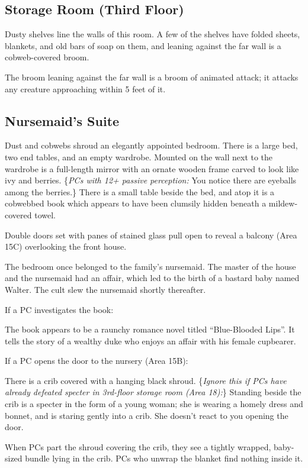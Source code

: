 \pagebreak
\subsection{Storage Room (Third Floor)}
\label{sec:StorageRoom3dFlr}
\begin{readout}
  Dusty shelves line the walls of this room. A few of the shelves have folded sheets, blankets, and old bars
  of soap on them, and leaning against the far wall is a cobweb-covered broom.
\end{readout}
The broom leaning against the far wall is a broom of animated attack; it attacks any creature approaching
within 5 feet of it.

\begin{arealinks}
\end{arealinks}


\pagebreak
\subsection{Nursemaid's Suite}
\label{sec:NursemaidsSuite}
\begin{readout}
  Dust and cobwebs shroud an elegantly appointed bedroom. There is a large bed, two end tables, and an
  empty wardrobe. Mounted on the wall next to the wardrobe is a full-length mirror with an ornate wooden
  frame carved to look like ivy and berries. \{\textit{PCs with 12+ passive perception:} You notice there
  are eyeballs among the berries.\} There is a small table beside the bed, and atop it is a cobwebbed book
  which appears to have been clumsily hidden beneath a mildew-covered towel.
\end{readout}
Double doors set with panes of stained glass pull open to reveal a balcony (Area 15C) overlooking the front
house.

The bedroom once belonged to the family's nursemaid. The master of the house and the nursemaid had an affair,
which led to the birth of a bastard baby named Walter. The cult slew the nursemaid shortly thereafter.

If a PC investigates the book:
\begin{readout}
  The book appears to be a raunchy romance novel titled ``Blue-Blooded Lips''. It tells the story of a wealthy
  duke who enjoys an affair with his female cupbearer.
\end{readout}
If a PC opens the door to the nursery (Area 15B):
\begin{readout}
  There is a crib covered with a hanging black shroud. \{\textit{Ignore this if PCs have already defeated
  specter in 3rd-floor storage room (Area 18):}\} Standing beside the crib is a specter in the form
  of a young woman; she is wearing a homely dress and bonnet, and is staring gently into a crib.
  She doesn't react to you opening the door.
\end{readout}
When PCs part the shroud covering the crib, they see a tightly wrapped, baby-sized bundle lying in the crib.
PCs who unwrap the blanket find nothing inside it.

